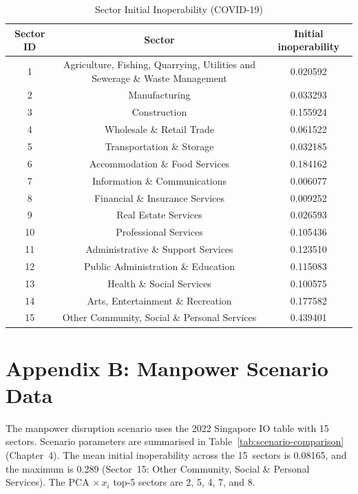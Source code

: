 \begin{table}[H]
\centering
\small
\setlength{\tabcolsep}{3pt}
\renewcommand{\arraystretch}{1.1}
\begin{tabular}{@{}ccc@{}}
\toprule
\rowcolor[HTML]{FFFFFF} 
\textbf{Sector ID} & \textbf{Sector} & \textbf{Initial inoperability} \\ \midrule
1 & Agriculture, Fishing,   Quarrying, Utilities and Sewerage \& Waste Management & 0.020592 \\
2 & Manufacturing & 0.033293 \\
3 & Construction & 0.155924 \\
4 & Wholesale  \&    Retail  Trade & 0.061522 \\
5 & Transportation  \&    Storage & 0.032185 \\
6 & Accommodation  \&    Food  Services & 0.184162 \\
7 & Information  \&    Communications & 0.006077 \\
8 & Financial  \&    Insurance  Services & 0.009252 \\
9 & Real  Estate    Services & 0.026593 \\
10 & Professional  Services & 0.105436 \\
11 & Administrative  \&    Support  Services & 0.123510 \\
12 & Public  Administration  \&    Education & 0.115083 \\
13 & Health  \&    Social  Services & 0.100575 \\
14 & Arts,  Entertainment  \&    Recreation & 0.177582 \\
15 & Other  Community,    Social  \&  Personal    Services & 0.439401 \\ \bottomrule
\end{tabular}
\caption{Sector Initial Inoperability (COVID-19)}
\label{tab:sector-inoperability}
\end{table}


\chapter*{Appendix B: Manpower Scenario Data}

The manpower disruption scenario uses the 2022 Singapore IO table with 15 sectors. Scenario parameters are summarised in Table~\ref{tab:scenario-comparison} (Chapter~4). The mean initial inoperability across the 15~sectors is 0.08165, and the maximum is 0.289 (Sector~15: Other Community, Social \& Personal Services). The PCA $\times\, x_i$ top-5 sectors are 2, 5, 4, 7, and 8.



